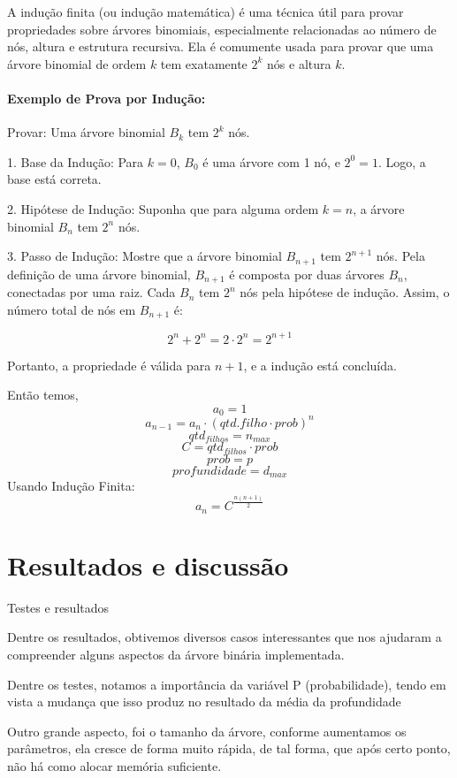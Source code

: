 \documentclass[12pt, a4paper]{scrreprt}
\begin{document}
A indução finita (ou indução matemática) é uma técnica útil para provar propriedades sobre árvores binomiais, especialmente relacionadas ao número de nós, altura e estrutura recursiva. Ela é comumente usada para provar que uma árvore binomial de ordem \( k \) tem exatamente \( 2^k \) nós e altura \( k \).

\subsubsection{Exemplo de Prova por Indução:}
Provar: Uma árvore binomial \( B_k \) tem \( 2^k \) nós.

1. Base da Indução: Para \( k = 0 \), \( B_0 \) é uma árvore com 1 nó, e \( 2^0 = 1 \). Logo, a base está correta.

2. Hipótese de Indução: Suponha que para alguma ordem \( k = n \), a árvore binomial \( B_n \) tem \( 2^n \) nós.

3. Passo de Indução: Mostre que a árvore binomial \( B_{n+1} \) tem \( 2^{n+1} \) nós. Pela definição de uma árvore binomial, \( B_{n+1} \) é composta por duas árvores \( B_n \), conectadas por uma raiz. Cada \( B_n \) tem \( 2^n \) nós pela hipótese de indução. Assim, o número total de nós em \( B_{n+1} \) é:

\[
2^n + 2^n = 2 \cdot 2^n = 2^{n+1}
\]

Portanto, a propriedade é válida para \( n+1 \), e a indução está concluída.

Então temos, \[ a_0 = 1 \]\[ a_{n-1} = a_n \cdot (qtd.filho \cdot prob)^n \] \[ qtd_{filhos} = n_{max} \] \[ C = qtd_{filhos} \cdot prob \] \[ prob = p \] \[ profundidade = d_{max} \]
Usando Indução Finita: \[ a_n = C^{\frac{n(n+1)}{2}} \]

\chapter{Resultados e discussão}
Testes e resultados

Dentre os resultados, obtivemos diversos casos interessantes que nos ajudaram a compreender alguns aspectos da árvore binária implementada.

Dentre os testes, notamos a importância da variável P (probabilidade), tendo em vista a mudança que isso produz no resultado da média da profundidade

Outro grande aspecto, foi o tamanho da árvore, conforme aumentamos os parâmetros, ela cresce de forma muito rápida, de tal forma, que após certo ponto, não há como alocar memória suficiente.
\end{document}
